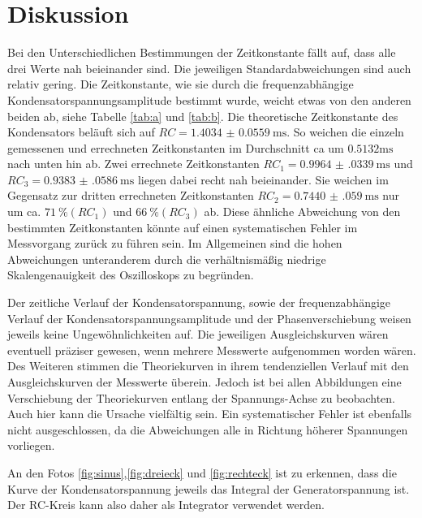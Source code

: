 \section{Diskussion}
\label{sec:Diskussion}

Bei den Unterschiedlichen Bestimmungen der Zeitkonstante fällt auf, dass alle drei Werte nah beieinander sind. Die jeweiligen 
Standardabweichungen sind auch relativ gering. Die Zeitkonstante, wie sie durch die frequenzabhängige Kondensatorspannungsamplitude 
bestimmt wurde, weicht etwas von den anderen beiden ab, siehe Tabelle \ref{tab:a} und \ref{tab:b}.
Die theoretische Zeitkonstante des Kondensators beläuft sich auf $RC = \SI{1.4034(559)}{\milli\s}$. So weichen die einzeln gemessenen und errechneten
Zeitkonstanten im Durchschnitt ca um $0.5132 \si{\milli\s}$ nach unten hin ab. Zwei errechnete Zeitkonstanten $RC_1= \SI{0.9964(0339)}{\milli\s}$ und $RC_3=\SI{0.9383(0586)}{\milli\s}$
liegen dabei recht nah beieinander. Sie weichen im Gegensatz zur dritten errechneten Zeitkonstanten $RC_2=\SI{0.7440(0590)}{\milli\s}$ nur um ca. $\SI{71}{\percent}(RC_1)$ und $\SI{66}{\percent}(RC_3)$ ab.
Diese ähnliche Abweichung von den bestimmten Zeitkonstanten könnte auf einen systematischen Fehler im Messvorgang zurück zu führen sein. Im Allgemeinen sind die hohen Abweichungen
unteranderem durch die verhältnismäßig niedrige Skalengenauigkeit des Oszilloskops zu begründen. 

Der zeitliche Verlauf der Kondensatorspannung, sowie der frequenzabhängige Verlauf der Kondensatorspannungsamplitude und der
Phasenverschiebung weisen jeweils keine Ungewöhnlichkeiten auf. Die jeweiligen Ausgleichskurven wären eventuell präziser
gewesen, wenn mehrere Messwerte aufgenommen worden wären. Des Weiteren stimmen die Theoriekurven in ihrem tendenziellen Verlauf mit den Ausgleichskurven der Messwerte überein. Jedoch ist bei allen Abbildungen eine Verschiebung der Theoriekurven entlang der Spannungs-Achse zu beobachten. Auch hier kann die Ursache vielfältig sein. Ein systematischer Fehler ist ebenfalls nicht ausgeschlossen, da die Abweichungen alle in Richtung höherer Spannungen vorliegen.

An den Fotos \ref{fig:sinus},\ref{fig:dreieck} und \ref{fig:rechteck} ist zu erkennen, dass die Kurve der Kondensatorspannung jeweils
das Integral der Generatorspannung ist. Der RC-Kreis kann also daher als Integrator verwendet werden. 




